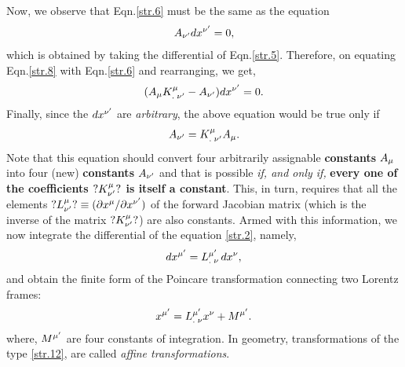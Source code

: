 \begin{small}
Now, we observe that Eqn.\eqref{str.6} must be the same as 
the equation 
\begin{align}\label{str.8}
A_{{\nu}'}dx^{{\nu}'} =0, 
\end{align}
which is obtained by taking the differential of 
Eqn.\eqref{str.5}. Therefore, on equating Eqn.\eqref{str.8} 
with Eqn.\eqref{str.6} and rearranging, we get, 
\begin{align}\label{str.9} 
(A_{{\mu}}{{{K}}^{{\mu}}_{.\;{\nu'}}}- 
A_{{\nu'}}) dx^{{\nu'}}=0 . 
\end{align} 
Finally, since the $dx^{{\nu'}}$ are \textsl{arbitrary}, the 
above equation would be true only if
\begin{align}\label{str.10}
A_{{\nu'}}= {{K}^{{\mu}}_{.\;{\nu'}}}{A}_{{\mu}}.
\end{align}
Note that this equation should convert four arbitrarily 
assignable \textbf{constants} $A_{{\mu}}$ into four (new) 
\textbf{constants} $A_{{\nu'}}$ and that is possible 
\textsl{if, and only if, }\textbf{every one of the 
coefficients $?K^{{\mu}}_{{\nu'}}?$ is itself a constant}. 
This, 
in turn, requires that all the elements $?L^{{\mu}}_{{\nu'}}? 
\equiv({\partial} {x}^{{\mu}} /{\partial} x^{{\nu'}})$ of the forward 
Jacobian matrix (which is the inverse of the matrix 
$?{K}^{{\mu}}_{{\nu'}}?$) are also constants. Armed with this 
information, we now integrate the differential of the 
equation \eqref{str.2}, namely,
\begin{align}\label{str.11}
dx^{{\mu'}} = {{L}^{{\mu'}}_{.\;{\nu}}}\,dx^{{\nu}} ,
\end{align}
and obtain the finite form of the Poincare transformation 
connecting two Lorentz frames:
\begin{align}\label{str.12}
x^{{\mu'}} ={{L}^{{\mu'}}_{.\;{\nu}}}x^{{\nu}} + M^{{\mu'}}.
\end{align}
where, $M^{{\mu'}}$ are four constants of integration. In 
geometry, transformations of the type \eqref{str.12}, are 
called \textsl{affine transformations}.


\end{small}
